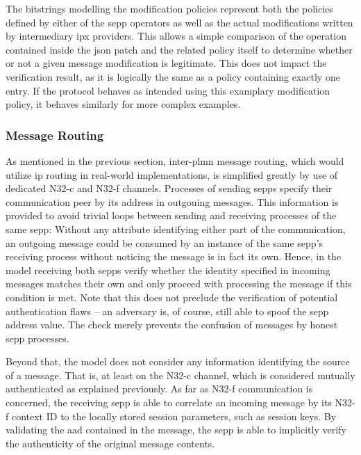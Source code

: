 The bitstrings modelling the modification policies represent both the policies defined by either of the \gls{sepp} operators as well as the actual modifications written by intermediary \gls{ipx} providers.
This allows a simple comparison of the operation contained inside the \gls{json} patch and the related policy itself to determine whether or not a given message modification is legitimate.
This does not impact the verification result, as it is logically the same as a policy containing exactly one entry.
If the protocol behaves as intended using this examplary modification policy, it behaves similarly for more complex examples.

\subsubsection{Message Routing}

As mentioned in the previous section, inter-\gls{plmn} message routing, which would utilize \gls{ip} routing in real-world implementations, is simplified greatly by use of dedicated N32-c and N32-f channels.
Processes of sending \glspl{sepp} specify their communication peer by its address in outgouing messages.
This information is provided to avoid trivial loops between sending and receiving processes of the same \gls{sepp}:
Without any attribute identifying either part of the communication, an outgoing message could be consumed by an instance of the same \gls{sepp}'s receiving process without noticing the message is in fact its own.
Hence, in the model receiving both \glspl{sepp} verify whether the identity specified in incoming messages matches their own and only proceed with processing the message if this condition is met.
Note that this does not preclude the verification of potential authentication flaws -- an adversary is, of course, still able to spoof the \gls{sepp} address value.
The check merely prevents the confusion of messages by honest \gls{sepp} processes.

Beyond that, the model does not consider any information identifying the source of a message.
That is, at least on the N32-c channel, which is considered mutually authenticated as explained previously.
As far as N32-f communication is concerned, the receiving \gls{sepp} is able to correlate an incoming message by its N32-f context ID to the locally stored session parameters, such as session keys.
By validating the \gls{aad} contained in the message, the \gls{sepp} is able to implicitly verify the authenticity of the original message contents.

